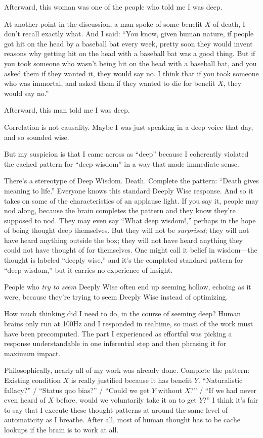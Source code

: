 {
 Afterward, this woman was one of the people who told me I was
deep.}

{
 At another point in the discussion, a man spoke of some benefit $X$
of death, I don't recall exactly what. And I said:
``You know, given human nature, if people got hit on
the head by a baseball bat every week, pretty soon they would invent
reasons why getting hit on the head with a baseball bat was a good
thing. But if you took someone who wasn't being hit on
the head with a baseball bat, and you asked them if they wanted it,
they would say no. I think that if you took someone who was immortal,
and asked them if they wanted to die for benefit $X$, they would say
no.''}

{
 Afterward, this man told me I was deep.}

{
 Correlation is not causality. Maybe I was just speaking in a deep
voice that day, and so sounded wise.}

{
 But my suspicion is that I came across as
``deep'' because I coherently
violated the cached pattern for ``deep
wisdom'' in a way that made immediate sense.}

{
 There's a stereotype of Deep Wisdom. Death.
Complete the pattern: ``Death gives meaning to
life.'' Everyone knows this standard Deeply Wise
response. And so it takes on some of the characteristics of an applause
light. If you say it, people may nod along, because the brain completes
the pattern and they know they're supposed to nod. They
may even say ``What deep wisdom!,''
perhaps in the hope of being thought deep themselves. But they will not
be \textit{surprised}; they will not have heard anything outside the
box; they will not have heard anything they could not have thought of
for themselves. One might call it belief in wisdom---the thought is
labeled ``deeply wise,'' and
it's the completed standard pattern for
``deep wisdom,'' but it carries no
experience of insight.}

{
 People who \textit{try to seem} Deeply Wise often end up seeming
hollow, echoing as it were, because they're trying to
seem Deeply Wise instead of optimizing.}

{
 How much thinking did I need to do, in the course of seeming deep?
Human brains only run at 100Hz and I responded in realtime, so most of
the work must have been precomputed. The part I experienced as
effortful was picking a response understandable in one inferential step
and then phrasing it for maximum impact.}

{
 Philosophically, nearly all of my work was already done. Complete
the pattern: Existing condition $X$ is really justified because it has
benefit $Y$. ``Naturalistic fallacy?''
/ ``Status quo bias?'' /
``Could we get $Y$ without $X$?'' /
``If we had never even heard of $X$ before, would we
voluntarily take it on to get $Y$?'' I think
it's fair to say that I execute these thought-patterns
at around the same level of automaticity as I breathe. After all, most
of human thought has to be cache lookups if the brain is to work at
all.}

